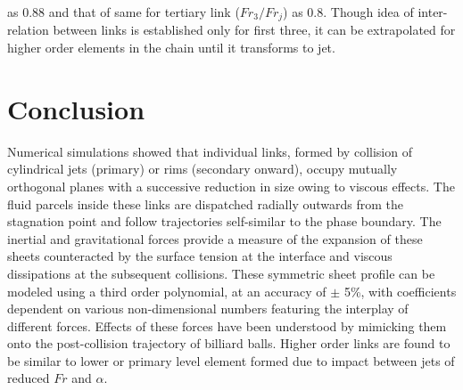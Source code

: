 \documentclass{jfm}
\begin{document}
as 0.88 and that of same for tertiary link ($Fr_3/Fr_j$) as 0.8. Though idea of inter-relation between links is established only for first three, it can be extrapolated for higher order elements in the chain until it transforms to jet.
\section{Conclusion}
Numerical simulations showed that individual links, formed by collision of cylindrical jets (primary) or rims (secondary onward), occupy mutually orthogonal planes with a successive reduction in size owing to viscous effects. The fluid parcels inside these links are dispatched radially outwards from the stagnation point and follow trajectories self-similar to the phase boundary. The inertial and gravitational forces provide a measure of the expansion of these sheets counteracted by the surface tension at the interface and viscous dissipations at the subsequent collisions. These symmetric sheet profile can be modeled using a third order polynomial, at an accuracy of $\pm$ 5\%, with coefficients dependent on various non-dimensional numbers featuring the interplay of different forces. Effects of these forces have been understood by mimicking them onto the post-collision trajectory of billiard balls. Higher order links are found to be similar to lower or primary level element formed due to impact between jets of reduced $Fr$ and $\alpha$. 


\end{document}
